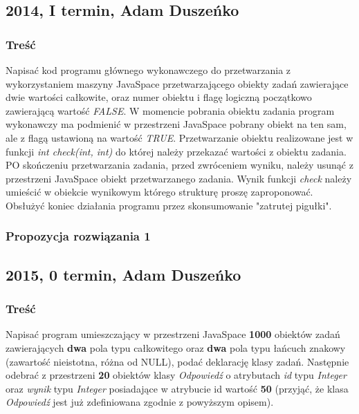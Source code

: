 	\subsection{2014, I termin, Adam Duszeńko}
		\subsubsection{Treść}
			Napisać kod programu głównego wykonawczego do przetwarzania z wykorzystaniem maszyny JavaSpace przetwarzającego obiekty zadań zawierające dwie wartości całkowite, oraz numer obiektu i flagę logiczną początkowo zawierającą wartość \textit{FALSE}. W momencie pobrania obiektu zadania program wykonawczy ma podmienić w przestrzeni JavaSpace pobrany obiekt na ten sam, ale z flagą ustawioną na wartość \textit{TRUE}. Przetwarzanie obiektu realizowane jest w funkcji \textit{int check(int, int)} do której należy przekazać wartości z obiektu zadania. PO skończeniu przetwarzania zadania, przed zwróceniem wyniku, należy usunąć z przestrzeni JavaSpace obiekt przetwarzanego zadania. Wynik funkcji \textit{check} należy umieścić w obiekcie wynikowym którego strukturę proszę zaproponować. Obsłużyć koniec działania programu przez skonsumowanie "zatrutej pigułki".
		\subsubsection{Propozycja rozwiązania 1}
	\newpage
	\subsection{2015, 0 termin, Adam Duszeńko}
		\subsubsection{Treść}
			Napisać program umieszczający w przestrzeni JavaSpace \textbf{1000} obiektów zadań zawierających \textbf{dwa} pola typu całkowitego oraz \textbf{dwa} pola typu łańcuch znakowy (zawartość nieistotna, różna od NULL), podać deklarację klasy zadań. Następnie odebrać z przestrzeni \textbf{20} obiektów klasy \textit{Odpowiedź} o atrybutach \textit{id} typu \textit{Integer} oraz \textit{wynik} typu \textit{Integer} posiadające w atrybucie id wartość \textbf{50} (przyjąć, że klasa \textit{Odpowiedź} jest już zdefiniowana zgodnie z powyższym opisem).
